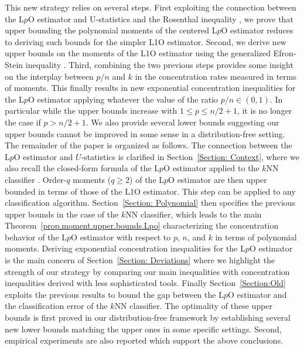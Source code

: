 \documentclass[twoside,11pt]{article}
\numberwithin{equation}{section}
\newcommand{\1}{\mathds{1}}%
\numberwithin{equation}{section}
\theoremstyle{plain}
\begin{document}
This new strategy relies on several steps.
%
First exploiting the connection between the L$p$O estimator and U-statistics \citep{Ko_Bo:1994} and the Rosenthal inequality \citep{IbragShar2002}, we prove that upper bounding the polynomial moments of the centered L$p$O estimator reduces to deriving such bounds for the simpler L1O estimator.
%
Second, we derive new upper bounds on the moments of the L1O estimator using the generalized Efron-Stein inequality \citep[][Theorem~15.5]{Bou_Bou_Lug_Mas:2005,BouLugMas_2013}.
%
Third, combining the two previous steps provides some insight on the interplay between $p/n$ and $k$ in the concentration rates measured in terms of moments.
%
This finally results in new exponential concentration inequalities for the L$p$O estimator applying whatever the value of the ratio $p/n \in (0,1) $. In particular while the upper bounds increase with $1\leq p\leq n/2+1$, it is no longer the case if $p>n/2+1$.
%
We also provide several lower bounds suggesting our upper bounds cannot be improved in some sense in a distribution-free setting.\\


The remainder of the paper is organized as follows.
%
The connection between the L$p$O estimator and $U$-statistics is clarified in Section~\ref{Section: Context}, where we also recall the closed-form formula of the L$p$O estimator applied to the $k$NN classifier \citep{CelisseMaryHuard11}. Order-$q$ moments ($q\geq 2$) of the L$p$O estimator are then upper bounded in terms of those of the L1O estimator. This step can be applied to any classification algorithm. %
%
Section~\ref{Section: Polynomial} then specifies the previous upper bounds in the case of the $k$NN classifier, which leads to the main Theorem~\ref{prop.moment.upper.bounds.Lpo} characterizing the concentration behavior of the L$p$O estimator with respect to $p$, $n$, and $k$ in terms of polynomial moments.
%
Deriving exponential concentration inequalities for the L$p$O estimator is the main concern of Section~\ref{Section: Deviations} where we highlight the strength of our strategy by comparing our main inequalities with concentration inequalities derived with less sophisticated tools.
%
Finally Section~\ref{Section:Old} exploits the previous results to bound the gap between the L$p$O estimator and the classification error of the $k$NN classifier. The optimality of these upper bounds is first proved in our distribution-free framework by establishing several new lower bounds matching the upper ones in some specific settings. Second, empirical experiments are also reported which support the above conclusions.
\end{document}
